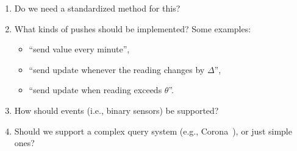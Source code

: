 \begin{enumerate}
	\item Do we need a standardized method for this?
	\item What kinds of pushes should be implemented? Some examples:
	  \begin{itemize}
	  \item ``send value every minute'',
	  \item ``send update whenever the reading changes by $\Delta$'',
	  \item ``send update when reading exceeds $\theta$''.
	  \end{itemize}
	\item How should events (i.e., binary sensors) be supported?
	\item Should we support a complex query system (e.g., Corona~\cite{corona}), or just simple ones?
\end{enumerate}
